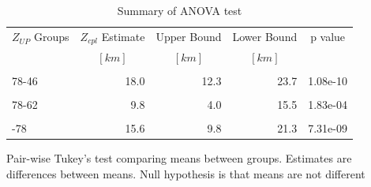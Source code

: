 \begin{table}

\caption{\label{tab:anova}Summary of ANOVA test}
\centering
\begin{threeparttable}
\begin{tabular}[t]{lrrrl}
\toprule
\multicolumn{1}{c}{$Z_{UP}$ Groups} & \multicolumn{1}{c}{$Z_{cpl}$ Estimate} & \multicolumn{1}{c}{Upper Bound} & \multicolumn{1}{c}{Lower Bound} & \multicolumn{1}{c}{p value} \\
\multicolumn{1}{c}{} & \multicolumn{1}{c}{$[km]$} & \multicolumn{1}{c}{$[km]$} & \multicolumn{1}{c}{$[km]$} & \multicolumn{1}{c}{}\\
\midrule
\cellcolor{gray!6}{62-46} & \cellcolor{gray!6}{8.3} & \cellcolor{gray!6}{2.5} & \cellcolor{gray!6}{14.0} & \cellcolor{gray!6}{1.84e-03}\\
78-46 & 18.0 & 12.3 & 23.7 & 1.08e-10\\
\cellcolor{gray!6}{94-46} & \cellcolor{gray!6}{33.6} & \cellcolor{gray!6}{27.8} & \cellcolor{gray!6}{39.3} & \cellcolor{gray!6}{1.99e-11}\\
78-62 & 9.8 & 4.0 & 15.5 & 1.83e-04\\
\cellcolor{gray!6}{94-62} & \cellcolor{gray!6}{25.3} & \cellcolor{gray!6}{19.6} & \cellcolor{gray!6}{31.0} & \cellcolor{gray!6}{1.99e-11}\\
\addlinespace
94-78 & 15.6 & 9.8 & 21.3 & 7.31e-09\\
\bottomrule
\end{tabular}
\begin{tablenotes}
\item Pair-wise Tukey's test comparing means between groups. Estimates are differences between means. Null hypothesis is that means are not different
\end{tablenotes}
\end{threeparttable}
\end{table}

